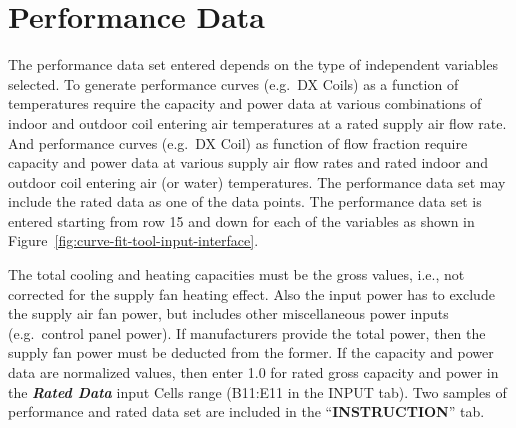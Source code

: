 \section{Performance Data}\label{performance-data}

The performance data set entered depends on the type of independent variables selected. To generate performance curves (e.g.~DX Coils) as a function of temperatures require the capacity and power data at various combinations of indoor and outdoor coil entering air temperatures at a rated supply air flow rate. And performance curves (e.g.~DX Coil) as function of flow fraction require capacity and power data at various supply air flow rates and rated indoor and outdoor coil entering air (or water) temperatures. The performance data set may include the rated data as one of the data points. The performance data set is entered starting from row 15 and down for each of the variables as shown in Figure~\ref{fig:curve-fit-tool-input-interface}.

The total cooling and heating capacities must be the gross values, i.e., not corrected for the supply fan heating effect. Also the input power has to exclude the supply air fan power, but includes other miscellaneous power inputs (e.g.~control panel power). If manufacturers provide the total power, then the supply fan power must be deducted from the former. If the capacity and power data are normalized values, then enter 1.0 for rated gross capacity and power in the \textbf{\emph{Rated Data}} input Cells range (B11:E11 in the INPUT tab). Two samples of performance and rated data set are included in the ``\textbf{INSTRUCTION}'' tab.
